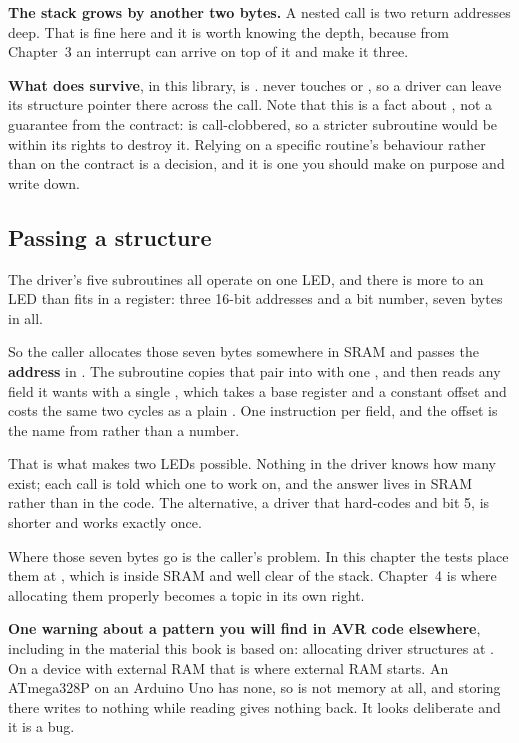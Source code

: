 \textbf{The stack grows by another two bytes.} A nested call is two return addresses deep. That is
fine here and it is worth knowing the depth, because from Chapter~3 an interrupt can arrive on top
of it and make it three.

\textbf{What does survive}, in this library, is .  never touches
 or , so a driver can leave its structure pointer there across the call. Note
that this is a fact about , not a guarantee from the contract:  is
call-clobbered, so a stricter subroutine would be within its rights to destroy it. Relying on a
specific routine's behaviour rather than on the contract is a decision, and it is one you should
make on purpose and write down.

\subsection{Passing a structure}
\label{c2:sec:struct}
The driver's five subroutines all operate on one LED, and there is more to an LED than fits in a
register: three 16-bit addresses and a bit number, seven bytes in all.

So the caller allocates those seven bytes somewhere in SRAM and passes the \textbf{address} in
. The subroutine copies that pair into  with one , and then reads
any field it wants with a single , which takes a base register and a constant offset and
costs the same two cycles as a plain . One instruction per field, and the offset is the
name from  rather than a number.

That is what makes two LEDs possible. Nothing in the driver knows how many exist; each call is told
which one to work on, and the answer lives in SRAM rather than in the code. The alternative, a
driver that hard-codes  and bit 5, is shorter and works exactly once.

Where those seven bytes go is the caller's problem. In this chapter the tests place them at
, which is inside SRAM and well clear of the stack. Chapter~4 is where allocating them
properly becomes a topic in its own right.

\textbf{One warning about a pattern you will find in AVR code elsewhere}, including in the material
this book is based on: allocating driver structures at . On a device with external
RAM that is where external RAM starts. An ATmega328P on an Arduino Uno has none, so
 is not memory at all, and storing there writes to nothing while reading gives
nothing back. It looks deliberate and it is a bug.

